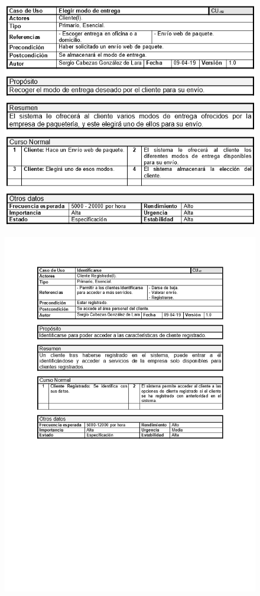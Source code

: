 \begin{figure}[H]
	\centering
	\includegraphics[width=16cm]{59}
\end{figure}
\begin{figure}[H]
	\centering
	\includegraphics[width=16cm]{61}
\end{figure}
